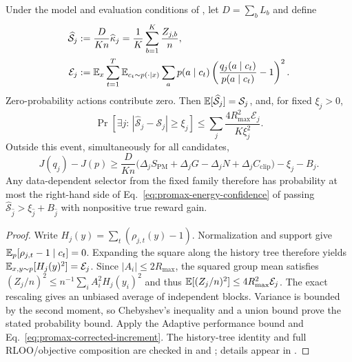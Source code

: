 \begin{corollary}
\label{cor:promax-energy-certificate}
Under the model and evaluation conditions of
, let $D=\sum_b L_b$ and define
\begin{align}
    \widehat{\mathcal S}_j
    &:=\frac{D}{Kn}\widehat\kappa_j
      =\frac{1}{K}\sum_{b=1}^{K}\frac{Z_{j,b}}{n},
      \label{eq:promax-observed-rescaling}\\
    \mathcal E_j
    &:=\mathbb{E}_x\sum_{t=1}^{T}\mathbb{E}_{c_t\sim p(\cdot\mid x)}
       \sum_a p(a\mid c_t)
          \left(\frac{q_j(a\mid c_t)}{p(a\mid c_t)}-1\right)^2.
      \label{eq:promax-ratio-energy}
\end{align}
Zero-probability actions contribute zero. Then
$\mathbb{E}[\widehat{\mathcal S}_j]=\mathcal S_j$, and, for fixed $\xi_j>0$,
\begin{equation}
    \Pr\!\left[\exists j:\,
      |\widehat{\mathcal S}_j-\mathcal S_j|\ge\xi_j\right]
    \le\sum_j\frac{4R_{\max}^2\mathcal E_j}{K\xi_j^2}.
    \label{eq:promax-energy-confidence}
\end{equation}
Outside this event, simultaneously for all candidates,
\begin{equation}
    J(q_j)-J(p)\ge
    \frac{D}{Kn}\bigl(\Delta_j S_{\mathrm{PM}}+\Delta_jG
      -\Delta_jN+\Delta_j C_{\mathrm{clip}}\bigr)-\xi_j-B_j.
    \label{eq:promax-observed-certificate}
\end{equation}
Any data-dependent selector from the fixed family therefore has probability
at most the right-hand side of Eq.~\eqref{eq:promax-energy-confidence} of
passing $\widehat{\mathcal S}_{\hat j}>\xi_{\hat j}+B_{\hat j}$ with
nonpositive true reward gain.
\end{corollary}

\begin{proof}
Write $H_j(y)=\sum_t(\rho_{j,t}(y)-1)$. Normalization and support give
$\mathbb{E}_p[\rho_{j,t}-1\mid c_t]=0$. Expanding the square along the history tree
therefore yields $\mathbb{E}_{x,y\sim p}[H_j(y)^2]=\mathcal E_j$.
Since $|A_i|\le2R_{\max}$, the squared group mean satisfies
$(Z_j/n)^2\le n^{-1}\sum_i A_i^2H_j(y_i)^2$ and thus
$\mathbb{E}[(Z_j/n)^2]\le4R_{\max}^2\mathcal E_j$.
The exact rescaling gives an unbiased average of independent blocks.
Variance is bounded by the second moment, so Chebyshev's inequality and a
union bound prove the stated probability bound. Apply the Adaptive
performance bound and Eq.~\eqref{eq:promax-corrected-increment}.
The history-tree identity and full RLOO/objective composition are checked in
 and
; details appear in
.
\end{proof}

